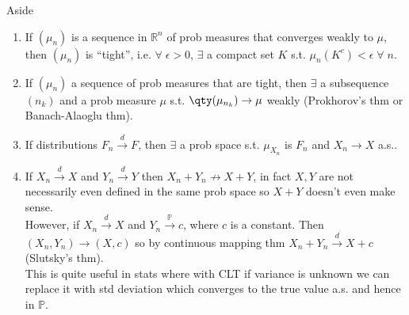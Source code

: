 \begin{aside}{Aside}
	\begin{enumerate}
		\item If $(\mu_n)$ is a sequence in $\mathbb{R}^n$ of prob measures that converges weakly to $\mu$, then $(\mu_n)$ is ``tight'', i.e. $\forall \; \epsilon > 0$, $\exists$ a compact set $K$ s.t. $\mu_n(K^c) < \epsilon \; \forall \; n$.
		\item If $(\mu_n)$ a sequence of prob measures that are tight, then $\exists$ a subsequence $(n_k)$ and a prob measure $\mu$ s.t. $\qty(\mu_{n_k}) \to \mu$ weakly (Prokhorov's  thm or Banach-Alaoglu thm).
		\item If distributions $F_n \xrightarrow{d} F$, then $\exists$ a prob space s.t. $\mu_{X_n}$ is $F_n$ and $X_n \to X$ a.s..
		\item If $X_n \xrightarrow{d} X$ and $Y_n \xrightarrow{d} Y$ then $X_n + Y_n \not\to X + Y$, in fact $X, Y$ are not necessarily even defined in the same prob space so $X + Y$ doesn't even make sense. \\
		However, if $X_n \xrightarrow{d} X$ and $Y_n \xrightarrow{\mathbb{P}} c$, where $c$ is a constant.
		Then $(X_n, Y_n) \to (X, c)$ so by continuous mapping thm $X_n + Y_n \xrightarrow{d} X + c$ (Slutsky's thm). \\
		This is quite useful in stats where with CLT if variance is unknown we can replace it with std deviation which converges to the true value a.s. and hence in $\mathbb{P}$.
	\end{enumerate}
\end{aside}